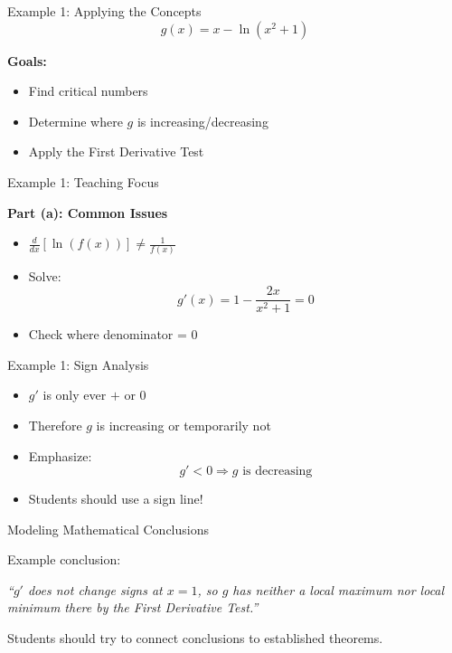 \documentclass[dvipsnames]{beamer}
\begin{document}
\begin{frame}{Example 1: Applying the Concepts}
\[
g(x)=x-\ln(x^2+1)
\]

\textbf{Goals:}
\begin{itemize}
\item Find critical numbers
\item Determine where $g$ is increasing/decreasing
\item Apply the First Derivative Test
\end{itemize}
\end{frame}

\begin{frame}{Example 1: Teaching Focus}

\textbf{Part (a): Common Issues}
\begin{itemize}
\item $\frac{d}{dx}[\ln(f(x))] \neq \frac{1}{f(x)}$
\item Solve:
\[
g'(x)=1-\frac{2x}{x^2+1}=0
\]
\item Check where denominator = 0
\end{itemize}
\end{frame}

\begin{frame}{Example 1: Sign Analysis}

\begin{itemize}
\item $g'$ is only ever $+$ or $0$
\item Therefore $g$ is increasing or temporarily not
\item Emphasize: 
\[
g'<0 \Rightarrow g \text{ is decreasing}
\]
\item Students should use a sign line!
\end{itemize}
\end{frame}

\begin{frame}{Modeling Mathematical Conclusions}

Example conclusion:

\medskip

\emph{``$g'$ does not change signs at $x=1$, so $g$ has neither a local maximum nor local minimum there by the First Derivative Test.''}

\medskip

\alert{Students should try to connect conclusions to established theorems.}
\end{frame}
\end{document}
